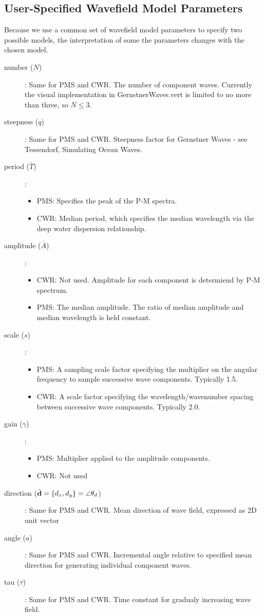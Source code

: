 \documentclass[11pt]{article}
\begin{document}
\subsection{User-Specified Wavefield Model Parameters}

Because we use a common set of wavefield model parameters to specify two possible models, the interpretation of some the parameters changes with the chosen model.
\begin{description}
\item[number ($N$)]: Same for PMS and CWR. The number of component waves.  Currently the visual implementation in GernstnerWaves.vert is limited to no more than three, so $N \leq 3$.
\item[steepness ($q$)]: Same for PMS and CWR. Steepness factor for Gernstner Waves - see Tessendorf, Simulating Ocean Waves. 
\item[period ($\bar{T}$)]:
  \begin{itemize}
  \item PMS: Specifies the peak of the P-M spectra.
  \item CWR: Median period, which specifies the median wavelength via the deep water dispersion relationship.
  \end{itemize}
\item[amplitude ($\bar{A}$)]:
  \begin{itemize}
  \item CWR: Not used.  Amplitude for each component is determiend by P-M spectrum.
  \item PMS: The median amplitude.  The ratio of median amplitude and median wavelength is held constant.
  \end{itemize}
\item[scale ($s$)]:
  \begin{itemize}
  \item PMS: A sampling scale factor specifying the multiplier on the angular frequency to sample successive wave components.  Typically 1.5.
  \item CWR: A scale factor specifying the wavelength/wavenumber spacing between successive wave components.  Typically 2.0.
  \end{itemize}
\item[gain ($\gamma$)]:
  \begin{itemize}
  \item PMS: Multiplier applied to the amplitude components.
  \item CWR: Not used
  \end{itemize}
\item[direction ($\bar{\mbox{${\bf d}$}}=\{d_x,d_y\}=\angle{\theta_d}$)]: Same for PMS and CWR. Mean direction of wave field, expressed as 2D unit vector
\item[angle ($a$)]: Same for PMS and CWR. Incremental angle relative to specified mean direction for generating individual component waves.
\item[tau ($\tau$)]: Same for PMS and CWR.  Time constant for gradualy increasing wave field.  
\end{description}
\end{document}
